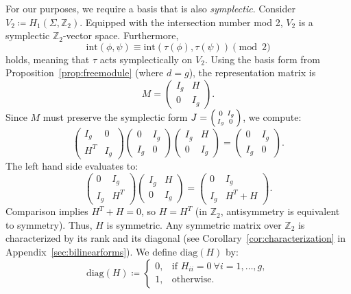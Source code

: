 \documentclass[11pt,a4paper]{article}
\theoremstyle{definition}
\newcommand{\Z}{\mathds{Z}}
\begin{document}
For our purposes, we require a basis that is also \emph{symplectic}. Consider $V_2 \coloneq H_1(\Sigma,\Z_2)$. Equipped with the intersection number mod 2, $V_2$ is a symplectic $\Z_2$-vector space. Furthermore,
\[
\mathrm{int}(\phi,\psi) \equiv \mathrm{int}(\tau(\phi),\tau(\psi)) \pmod 2
\]
holds, meaning that $\tau$ acts symplectically on $V_2$. Using the basis form from Proposition~\ref{prop:freemodule} (where $d=g$), the representation matrix is
\[
M = \begin{pmatrix}
	I_g & H \\
	0 & I_g
\end{pmatrix}.
\]
Since $M$ must preserve the symplectic form $J = \begin{psmallmatrix} 0 & I_g \\ I_g & 0 \end{psmallmatrix}$, we compute:
\[
\begin{pmatrix}
	I_g & 0 \\
	H^T & I_g
\end{pmatrix}
\begin{pmatrix}
	0 & I_g \\
	I_g & 0
\end{pmatrix}
\begin{pmatrix}
	I_g & H \\
	0 & I_g
\end{pmatrix}
=
\begin{pmatrix}
	0 & I_g \\
	I_g & 0
\end{pmatrix}.
\]
The left hand side evaluates to:
\[
\begin{pmatrix}
	0 & I_g \\
	I_g & H^T
\end{pmatrix}
\begin{pmatrix}
	I_g & H \\
	0 & I_g
\end{pmatrix}
=
\begin{pmatrix}
	0 & I_g \\
	I_g & H^T + H
\end{pmatrix}.
\]
Comparison implies $H^T + H = 0$, so $H = H^T$ (in $\Z_2$, antisymmetry is equivalent to symmetry). Thus, $H$ is symmetric. Any symmetric matrix over $\Z_2$ is characterized by its rank and its diagonal (see Corollary~\ref{cor:characterization} in Appendix~\ref{sec:bilinearforms}). We define $\mathrm{diag}(H)$ by:
\[
\mathrm{diag}(H) \coloneq
\begin{cases}
	0, & \text{if } H_{ii} = 0 \ \forall i=1,\dots,g,\\
	1, & \text{otherwise}.
\end{cases}
\]
\end{document}
